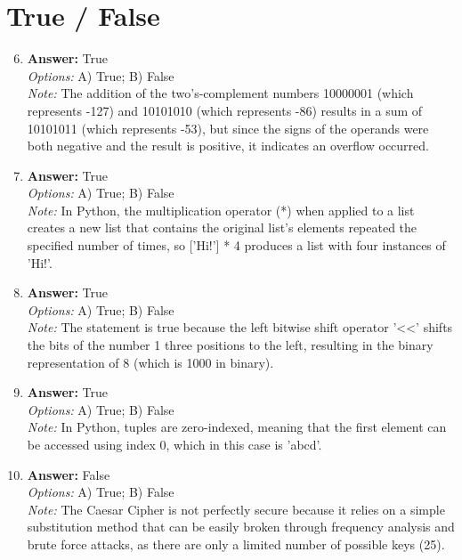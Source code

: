 \documentclass[12pt]{article}
\begin{document}
\section*{True / False}
\begin{enumerate}[label=\arabic*.]
\setcounter{enumi}{5}
\item \textbf{Answer:} True
\\ \textit{Options:} A) True; B) False
\\ \textit{Note:} The addition of the two's-complement numbers 10000001 (which represents -127) and 10101010 (which represents -86) results in a sum of 10101011 (which represents -53), but since the signs of the operands were both negative and the result is positive, it indicates an overflow occurred.
\item \textbf{Answer:} True
\\ \textit{Options:} A) True; B) False
\\ \textit{Note:} In Python, the multiplication operator (*) when applied to a list creates a new list that contains the original list's elements repeated the specified number of times, so ['Hi!'] * 4 produces a list with four instances of 'Hi!'.
\item \textbf{Answer:} True
\\ \textit{Options:} A) True; B) False
\\ \textit{Note:} The statement is true because the left bitwise shift operator '\textless{}\textless{}' shifts the bits of the number 1 three positions to the left, resulting in the binary representation of 8 (which is 1000 in binary).
\item \textbf{Answer:} True
\\ \textit{Options:} A) True; B) False
\\ \textit{Note:} In Python, tuples are zero-indexed, meaning that the first element can be accessed using index 0, which in this case is 'abcd'.
\item \textbf{Answer:} False
\\ \textit{Options:} A) True; B) False
\\ \textit{Note:} The Caesar Cipher is not perfectly secure because it relies on a simple substitution method that can be easily broken through frequency analysis and brute force attacks, as there are only a limited number of possible keys (25).
\end{enumerate}
\end{document}
